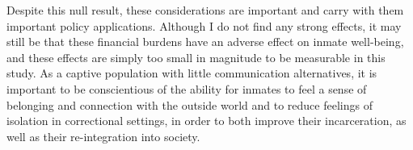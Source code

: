 Despite this null result, these considerations are important and carry with them important policy applications. Although I do not find any strong effects, it may still be that these financial burdens have an adverse effect on inmate well-being, and these effects are simply too small in magnitude to be measurable in this study. As a captive population with little communication alternatives, it is important to be conscientious of the ability for inmates to feel a sense of belonging and connection with the outside world and to reduce feelings of isolation in correctional settings, in order to both improve their incarceration, as well as their re-integration into society. \\
